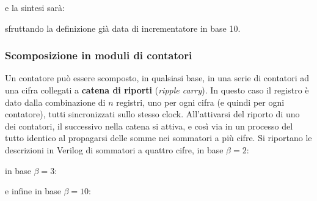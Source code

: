 \documentclass[a4paper,11pt]{article}
\begin{document}
e la sintesi sarà:

sfruttando la definizione già data di incrementatore in base 10.

\subsubsection{Scomposizione in moduli di contatori}
Un contatore può essere scomposto, in qualsiasi base, in una serie di contatori ad una cifra collegati a \textbf{catena di riporti} (\textit{ripple carry}).
In questo caso il registro è dato dalla combinazione di $n$ registri, uno per ogni cifra (e quindi per ogni contatore), tutti sincronizzati sullo stesso clock.
All'attivarsi del riporto di uno dei contatori, il successivo nella catena si attiva, e così via in un processo del tutto identico al propagarsi delle somme nei sommatori a più cifre.
Si riportano le descrizioni in Verilog di sommatori a quattro cifre, in base $\beta = 2$:



in base $\beta = 3$:



e infine in base $\beta = 10$:


\end{document}
